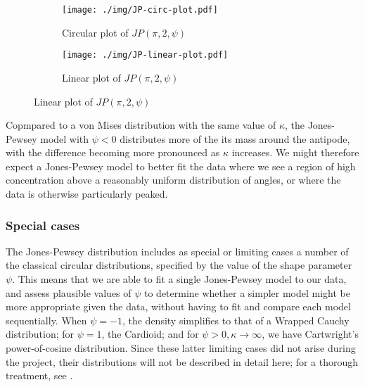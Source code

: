 \documentclass[../../ArchStats.tex]{subfiles}
\begin{document}
\begin{figure}[!ht]
\centering
\caption{Jones-Pewsey densities with $\mu = \pi$, $\kappa = 2$, and varying $\psi$}
\label{fig:JP-densities}
%
\begin{subfigure}[t]{0.4\textwidth}
\centering
\caption{Circular plot of $JP(\pi, 2, \psi)$}
\texttt{[image: ./img/JP-circ-plot.pdf]}
\end{subfigure}
%
\begin{subfigure}[t]{0.4\textwidth}
\centering
\caption{Linear plot of $JP(\pi, 2, \psi)$}
\texttt{[image: ./img/JP-linear-plot.pdf]}
\end{subfigure}
%
\end{figure}

Copmpared to a von Mises distribution with the same value of $\kappa$, the Jones-Pewsey model with $\psi < 0$ distributes more of the its mass around the antipode, with the difference becoming more pronounced as $\kappa$ increases. We might therefore expect a Jones-Pewsey model to better fit the data where we see a region of high concentration above a reasonably uniform distribution of angles, or where the data is otherwise particularly peaked.


\subsubsection{Special cases}

The Jones-Pewsey distribution includes as special or limiting cases a number of the classical circular distributions, specified by the value of the shape parameter $\psi$. This means that we are able to fit a single Jones-Pewsey model to our data, and assess plausible values of $\psi$ to determine whether a simpler model might be more appropriate given the data, without having to fit and compare each model sequentially. When $\psi = -1$, the density simplifies to that of a Wrapped Cauchy distribution; for $\psi = 1$, the Cardioid; and for $\psi > 0, \kappa \rightarrow \infty$, we have Cartwright's power-of-cosine distribution. Since these latter limiting cases did not arise during the project, their distributions will  not be described in detail here; for a thorough treatment, see \cite{Jones2005}. 
\end{document}
